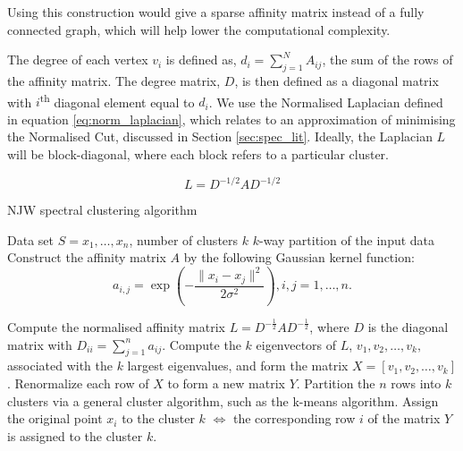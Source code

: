 \documentclass[12pt]{report}		%
\begin{document}
Using this construction would give a sparse affinity matrix instead of a fully connected graph, which will help lower the computational complexity. 

 The degree of each vertex $v_i$ is defined as, $d_i =\sum_{j = 1}^N A_{ij}$, the sum of the rows of the affinity matrix. The degree matrix, $D$, is then defined as a diagonal matrix with $i$\textsuperscript{th} diagonal element equal to $d_i$. We use the Normalised Laplacian defined in equation \ref{eq:norm_laplacian}, which relates to an approximation of minimising the Normalised Cut, discussed in Section \ref{sec:spec_lit}. Ideally, the Laplacian $L$ will be block-diagonal, where each block refers to a particular cluster. 

 \begin{equation}
   \label{eq:norm_laplacian}
   L=D^{-1/2}AD^{-1/2}
 \end{equation}


\begin{algorithm}
\caption{NJW spectral clustering algorithm}
\begin{algorithmic}[1]
\REQUIRE Data set $S = {x_1,\ldots, x_n  }$, number of clusters $k$
\ENSURE $k$-way partition of the input data
\STATE Construct the affinity matrix $A$ by the following Gaussian kernel function:
\begin{equation*}
  a_{i,j} = \exp  \left( - \frac{\| x_i - x_j \|^2}{2 \sigma^2} \right), i,j = 1, \ldots,n.
\end{equation*}

\STATE Compute the normalised affinity matrix $L = D^{-\frac{1}{2}}A D^{-\frac{1}{2}}$, where $D$ is the diagonal matrix with $D_{ii}=\sum_{j=1}^{n} a_{ij}.$
\STATE Compute the $k$ eigenvectors of $L$, $v_1, v_2,\ldots , v_k,$ associated with the $k$ largest eigenvalues, and form the matrix $ X = [v_1,v_2, \ldots , v_k]$.
\STATE Renormalize each row of $X$ to form a new matrix $Y$.
\STATE Partition the $n$ rows into $k$ clusters via a general cluster algorithm, such as the k-means algorithm.
\STATE Assign the original point $x_i$ to the cluster $k$ $\iff$ the corresponding row $i$ of the matrix $Y$ is assigned to the cluster $k$.

\end{algorithmic}
\label{alg:njw}
\end{algorithm}
\end{document}
